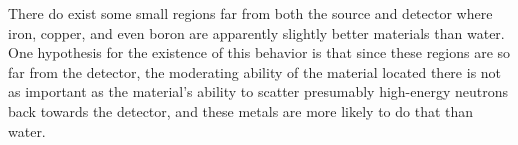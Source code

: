 There do exist some small regions far from both the source and detector where iron, copper, and even boron are apparently slightly better materials than water.
One hypothesis for the existence of this behavior is that since these regions are so far from the detector, the moderating ability of the material located there is not as important as the material's ability to scatter presumably high-energy neutrons back towards the detector, and these metals are more likely to do that than water.

